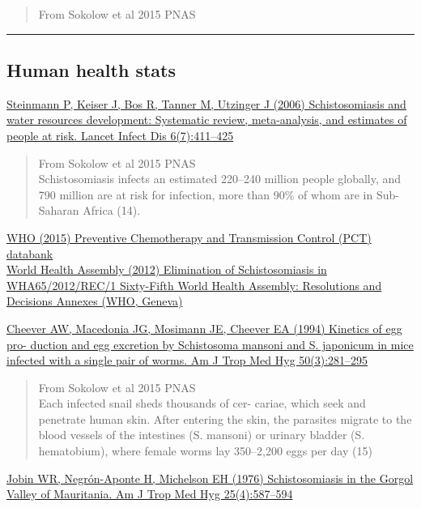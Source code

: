 \documentclass[10,portrait]{article}
\begin{document}
\begin{quote}
From Sokolow et al 2015 PNAS
\end{quote}

\newpage  

\begin{center}\rule{0.5\linewidth}{\linethickness}\end{center}

\subsection{Human health stats}\label{human-health-stats}

\href{}{Steinmann P, Keiser J, Bos R, Tanner M, Utzinger J (2006)
Schistosomiasis and water resources development: Systematic review,
meta-analysis, and estimates of people at risk. Lancet Infect Dis
6(7):411--425}

\begin{quote}
From Sokolow et al 2015 PNAS\\
Schistosomiasis infects an estimated 220--240 million people globally,
and 790 million are at risk for infection, more than 90\% of whom are in
Sub-Saharan Africa (14).
\end{quote}

\href{www.who.int/neglected_diseases/preventive_chemotherapy/databank/en/}{WHO
(2015) Preventive Chemotherapy and Transmission Control (PCT)
databank}\\
\href{}{World Health Assembly (2012) Elimination of Schistosomiasis in
WHA65/2012/REC/1 Sixty-Fifth World Health Assembly: Resolutions and
Decisions Annexes (WHO, Geneva)}

\href{}{Cheever AW, Macedonia JG, Mosimann JE, Cheever EA (1994)
Kinetics of egg pro- duction and egg excretion by Schistosoma mansoni
and S. japonicum in mice infected with a single pair of worms. Am J Trop
Med Hyg 50(3):281--295}

\begin{quote}
From Sokolow et al 2015 PNAS\\
Each infected snail sheds thousands of cer- cariae, which seek and
penetrate human skin. After entering the skin, the parasites migrate to
the blood vessels of the intestines (S. mansoni) or urinary bladder (S.
hematobium), where female worms lay 350--2,200 eggs per day (15)
\end{quote}

\href{}{Jobin WR, Negrón-Aponte H, Michelson EH (1976) Schistosomiasis
in the Gorgol Valley of Mauritania. Am J Trop Med Hyg 25(4):587--594}
\end{document}
